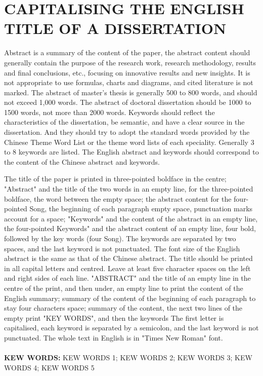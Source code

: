 \documentclass[UTF8,12pt,AutoFakeBold]{ctexart}
\begin{document}
	\section*{CAPITALISING THE ENGLISH TITLE OF A DISSERTATION}
	\begin{enabstract}
		\fontsize{14pt}{17.5pt}\selectfont%
		
		Abstract is a summary of the content of the paper, the abstract content should generally contain the purpose of the research work, research methodology, results and final conclusions, etc., focusing on innovative results and new insights. It is not appropriate to use formulas, charts and diagrams, and cited literature is not marked. The abstract of master's thesis is generally 500 to 800 words, and should not exceed 1,000 words. The abstract of doctoral dissertation should be 1000 to 1500 words, not more than 2000 words. Keywords should reflect the characteristics of the dissertation, be semantic, and have a clear source in the dissertation. And they should try to adopt the standard words provided by the Chinese Theme Word List or the theme word lists of each speciality. Generally 3 to 8 keywords are listed. The English abstract and keywords should correspond to the content of the Chinese abstract and keywords.
		\par
		The title of the paper is printed in three-pointed boldface in the centre; "Abstract" and the title of the two words in an empty line, for the three-pointed boldface, the word between the empty space; the abstract content for the four-pointed Song, the beginning of each paragraph empty space, punctuation marks account for a space; "Keywords" and the content of the abstract in an empty line, the four-pointed Keywords" and the abstract content of an empty line, four bold, followed by the key words (four Song). The keywords are separated by two spaces, and the last keyword is not punctuated.
		The font size of the English abstract is the same as that of the Chinese abstract. The title should be printed in all capital letters and centred. Leave at least five character spaces on the left and right sides of each line. "ABSTRACT" and the title of an empty line in the centre of the print, and then under, an empty line to print the content of the English summary; summary of the content of the beginning of each paragraph to stay four characters space; summary of the content, the next two lines of the empty print "KEY WORDS", and then the keywords The first letter is capitalised, each keyword is separated by a semicolon, and the last keyword is not punctuated. The whole text in English is in "Times New Roman" font.
		\\
		\\
		\textbf{KEW WORDS:} KEW WORDS 1;  KEW WORDS 2;  KEW WORDS 3;  KEW WORDS 4;  KEW WORDS 5
	\end{enabstract}
	\pagebreak
	
\end{document}
